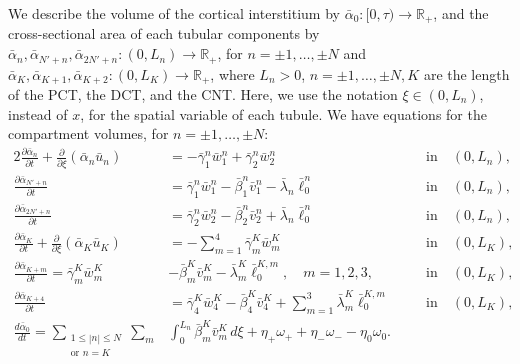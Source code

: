 \documentclass{article}
\begin{document}
We describe the volume of the cortical interstitium by $\bar{\alpha}_0:[0,\tau)\to \mathbb{R}_+$, and the cross-sectional area of each tubular components by $\bar{\alpha}_{n},\bar{\alpha}_{N'+n},\bar{\alpha}_{2N'+n}:(0,L_n)\to \mathbb{R}_+$, for $n=\pm 1,\dots,\pm N$ and $\bar{\alpha}_K,\bar{\alpha}_{K+1},\bar{\alpha}_{K+2}:(0,L_K)\to \mathbb{R}_+$, where $L_n>0$, $n=\pm 1,\dots,\pm N,K$ are the length of the PCT, the DCT, and the CNT.
Here, we use the notation $\xi\in(0,L_n)$, instead of $x$, for the spatial variable of each tubule.
We have equations for the compartment volumes, for $n=\pm 1,\dots,\pm N$:
\begin{alignat}{2}
    \frac{\partial \bar{\alpha}_n}{\partial t} + \frac{\partial}{\partial \xi}(\bar{\alpha}_n\bar{u}_n) &= -\bar{\gamma}_1^n\bar{w}_{1}^n+\bar{\gamma}_2^n\bar{w}_{2}^n\quad \quad \quad \ \  &&\text{in}\quad (0,L_n),\\
    \frac{\partial \bar{\alpha}_{N'+n}}{\partial t} &= \bar{\gamma}_1^n\bar{w}_{1}^n-\bar{\beta}_1^n\bar{v}_1^n-\bar{\lambda}_n\bar{\ell}_0^n\quad  &&\text{in}\quad (0,L_n),\\
    \frac{\partial \bar{\alpha}_{2N'+n}}{\partial t} &= \bar{\gamma}_2^n\bar{w}_{2}^n-\bar{\beta}_2^n\bar{v}_2^n+\bar{\lambda}_n\bar{\ell}_0^n\quad  &&\text{in}\quad (0,L_n),\\
    \frac{\partial \bar{\alpha}_K}{\partial t} + \frac{\partial}{\partial \xi}(\bar{\alpha}_K\bar{u}_K) &= -\sum_{m=1}^4\bar{\gamma}_m^K\bar{w}_{m}^K \qquad \quad \ \ \ \,  &&\text{in}\quad (0,L_K),\\
    \frac{\partial \bar{\alpha}_{K+m}}{\partial t} = \bar{\gamma}_m^K\bar{w}_{m}^K&-\bar{\beta}_m^K\bar{v}_m^K-\bar{\lambda}_m^K\bar{\ell}_0^{K,m},\quad m=1,2,3,\quad  &&\text{in}\quad (0,L_K),\\
    \frac{\partial \bar{\alpha}_{K+4}}{\partial t} &= \bar{\gamma}_4^K\bar{w}_4^K-\bar{\beta}_4^K\bar{v}_4^K+\sum_{m=1}^3\bar{\lambda}_m^K\bar{\ell}_0^{K,m}\quad  &&\text{in}\quad (0,L_K),\\
    \frac{d \bar{\alpha}_0}{d t} = 
        \sum_{\substack{1\leq|n|\leq N\\ \text{or } n=K}}\sum_m&\int_0^{L_n}\bar{\beta}_m^K\bar{v}_m^K\,d\xi+\eta_+\omega_++\eta_-\omega_--\eta_0\omega_0.
\end{alignat}
\end{document}
